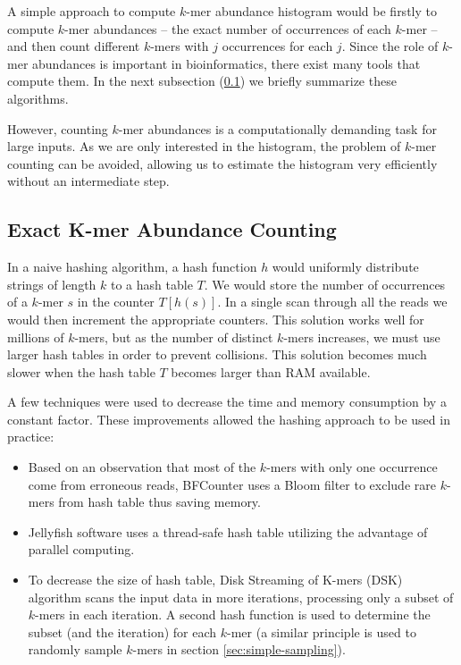 A simple approach to compute $k$-mer abundance histogram would be firstly to compute $k$-mer
abundances -- the exact number of occurrences of each $k$-mer -- and then count different $k$-mers
with $j$ occurrences for each $j$. Since the role of $k$-mer abundances is important in
bioinformatics, there exist many tools that compute them. 
In the next subsection (\ref{sec:exact-algorithms}) we briefly summarize these algorithms.

However, counting $k$-mer abundances is a computationally demanding task for large inputs.
As we are only interested in the histogram, the problem of $k$-mer counting can be avoided,
allowing us to estimate the histogram very efficiently without an intermediate step.

\subsection{Exact K-mer Abundance Counting}
\label{sec:exact-algorithms}
In a naive hashing algorithm, a hash function $h$ would uniformly distribute strings of
length $k$ to a hash table $T$. We would store the number of occurrences of a $k$-mer
$s$ in the counter $T[h(s)]$. In a single scan through all the reads we
would then increment the appropriate counters. This solution works well for
millions of $k$-mers, but as the number of distinct $k$-mers increases,
we must use larger hash tables in order to prevent collisions.
This solution becomes much slower when the hash table $T$ becomes larger than RAM available.

A few techniques were used to decrease the time and memory consumption by a constant factor. 
These improvements allowed the hashing approach to be used in practice:

\begin{itemize}
\item Based on an observation that most of the $k$-mers with only one occurrence come from
erroneous reads, BFCounter \cite{Melsted2011} uses a Bloom filter to exclude rare $k$-mers
from hash table thus saving memory.

\item Jellyfish \cite{Marcais2011} software uses a thread-safe hash table utilizing the 
advantage of parallel computing.

\item To decrease the size of hash table, Disk Streaming of K-mers (DSK) \cite{Rizk2013}
algorithm scans the input data in more iterations, processing only a subset of $k$-mers
in each iteration. A second hash function is used to determine the subset (and the iteration) 
for each $k$-mer (a similar principle is used to randomly sample $k$-mers 
in section \ref{sec:simple-sampling}).
\end{itemize}

